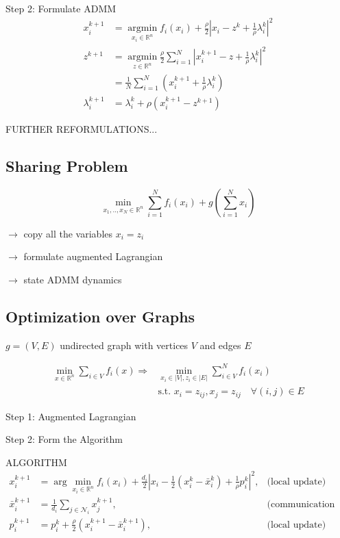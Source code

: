 Step 2: Formulate ADMM
$$\begin{aligned}
		x_i^{k+1} & = \underset{x_i\in\mathbb{R}^{n}}{\operatorname{argmin}}
		f_i(x_i)+\frac{\rho}{2}|x_i-z^k+\frac{1}{\rho}\lambda_i^k|^2
		\\
		z^{k+1}   & = \underset{z\in\mathbb{R}^{n}}{\operatorname{argmin}}
		\frac{\rho}{2}\sum_{i=1}^{N}
		|x_i^{k+1}-z+\frac{1}{\rho}\lambda_i^k|^2
		\\&=\frac{1}{N}\sum_{i=1}^{N}
		(x_i^{k+1}+\frac{1}{\rho}\lambda_i^k)
		\\
		\lambda_i^{k+1}
		          & =\lambda_i^k+\rho(x_i^{k+1}-z^{k+1})
	\end{aligned}$$

FURTHER REFORMULATIONS...


\subsection{Sharing Problem}

\begin{equation}
	\min_{x_1,..,x_N \in \mathbb{R}^{n}}
	\sum_{i = 1}^{N} f_i(x_i)
	+g\left(\sum_{i = 1}^{N}x_i\right)
\end{equation}

$\rightarrow$ copy all the variables $x_i=z_i$

$\rightarrow$ formulate augmented Lagrangian

$\rightarrow$ state ADMM dynamics

\subsection{Optimization over Graphs}


$g=(V,E)$ undirected graph with vertices $V$ and edges $E$

$$\begin{aligned}
		\min_{x \in \mathbb{R}^{n}} \sum_{i\in V} f_i(x)
		\Rightarrow
		 & \min_{x_i\in|V|,z_i\in|E|} \sum_{i\in V}^{N} f_i(x_i)
		\\&\text{s.t. }x_i=z_{ij}, x_j=z_{ij}\quad \forall(i,j)\in E
	\end{aligned}$$

Step 1: Augmented Lagrangian

Step 2: Form the Algorithm

ALGORITHM
\begin{align*}
	x_i^{k+1}       & = \arg\min_{x_i \in \mathbb{R}^n} f_i(x_i) + \frac{d_i}{2} \left| x_i - \frac{1}{2} (x_i^k - \bar{x}_i^k) + \frac{1}{\rho} p_i^k \right|^2, & \text{(local update)}                  \\
	\bar{x}_i^{k+1} & = \frac{1}{d_i} \sum_{j \in \mathcal{N}_i} x_j^{k+1},                                                                                       & \text{(communication with neighbours)} \\
	p_i^{k+1}       & = p_i^k + \frac{\rho}{2} (x_i^{k+1} - \bar{x}_i^{k+1}),                                                                                     & \text{(local update)}
\end{align*}
